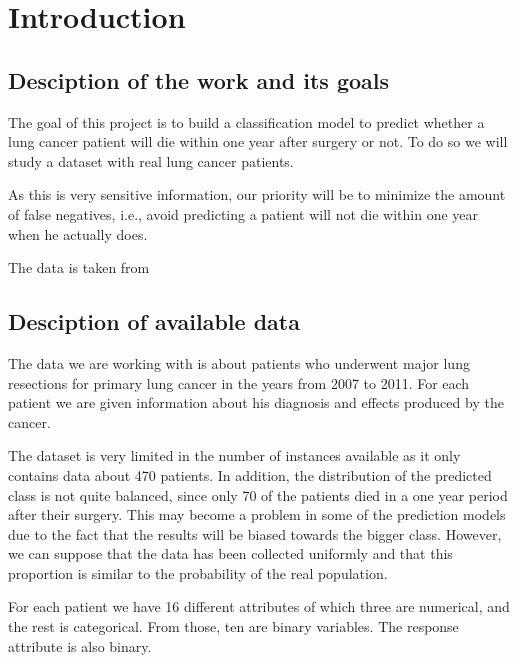 \section{Introduction}

\subsection{Desciption of the work and its goals}

The goal of this project is to build a classification model to predict whether
a lung cancer patient will die within one year after surgery or not. To do so
we will study a dataset with real lung cancer patients.

As this is very sensitive information, our priority will be to minimize the
amount of false negatives, i.e., avoid predicting a patient will not die within
one year when he actually does.

The data is taken from
\cite{zieba2013boosted}

\subsection{Desciption of available data}

The data we are working with is about patients who underwent major lung
resections for primary lung cancer in the years from 2007 to 2011. For each
patient we are given information about his diagnosis and effects produced
by the cancer.

The dataset is very limited in the number of instances available as it only contains
data about 470 patients. In addition, the distribution of the predicted class is not quite
balanced,
since only 70 of the patients died in a one year period after their surgery. This may
become a problem in some of the prediction models due to the fact that the results
will be biased towards the bigger class. However, we can suppose that the data has been
collected uniformly and that this proportion is similar to the probability of the real population.

For each patient we have 16 different attributes of which three are numerical, and
the rest is categorical. From those, ten are binary variables. The response attribute is
also binary.


%
%
